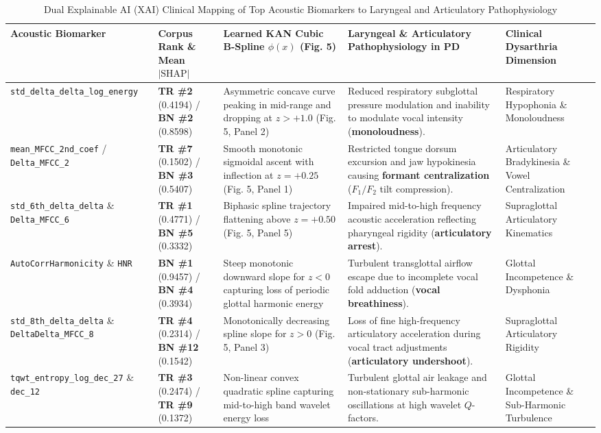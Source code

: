 \documentclass[journal,10pt,twoside]{IEEEtran}
\begin{document}
\begin{table}[t]
\caption{Dual Explainable AI (XAI) Clinical Mapping of Top Acoustic Biomarkers to Laryngeal and Articulatory Pathophysiology}
\label{tab:xai}
\centering
\scriptsize
\begin{tabular}{lp{3.2cm}p{4.2cm}p{4.5cm}l}
\toprule
\textbf{Acoustic Biomarker} & \textbf{Corpus Rank \& Mean $|\text{SHAP}|$} & \textbf{Learned KAN Cubic B-Spline $\phi(x)$ (Fig. 5)} & \textbf{Laryngeal \& Articulatory Pathophysiology in PD} & \textbf{Clinical Dysarthria Dimension} \\
\midrule
\texttt{std\_delta\_delta\_log\_energy} & \textbf{TR \#2} (0.4194) / \textbf{BN \#2} (0.8598) & Asymmetric concave curve peaking in mid-range and dropping at $z > +1.0$ (Fig. 5, Panel 2) & Reduced respiratory subglottal pressure modulation and inability to modulate vocal intensity (\textbf{monoloudness}). & Respiratory Hypophonia \& Monoloudness \\
\texttt{mean\_MFCC\_2nd\_coef} / \texttt{Delta\_MFCC\_2} & \textbf{TR \#7} (0.1502) / \textbf{BN \#3} (0.5407) & Smooth monotonic sigmoidal ascent with inflection at $z = +0.25$ (Fig. 5, Panel 1) & Restricted tongue dorsum excursion and jaw hypokinesia causing \textbf{formant centralization} ($F_1/F_2$ tilt compression). & Articulatory Bradykinesia \& Vowel Centralization \\
\texttt{std\_6th\_delta\_delta} \& \texttt{Delta\_MFCC\_6} & \textbf{TR \#1} (0.4771) / \textbf{BN \#5} (0.3332) & Biphasic spline trajectory flattening above $z = +0.50$ (Fig. 5, Panel 5) & Impaired mid-to-high frequency acoustic acceleration reflecting pharyngeal rigidity (\textbf{articulatory arrest}). & Supraglottal Articulatory Kinematics \\
\texttt{AutoCorrHarmonicity} \& \texttt{HNR} & \textbf{BN \#1} (0.9457) / \textbf{BN \#4} (0.3934) & Steep monotonic downward slope for $z < 0$ capturing loss of periodic glottal harmonic energy & Turbulent transglottal airflow escape due to incomplete vocal fold adduction (\textbf{vocal breathiness}). & Glottal Incompetence \& Dysphonia \\
\texttt{std\_8th\_delta\_delta} \& \texttt{DeltaDelta\_MFCC\_8} & \textbf{TR \#4} (0.2314) / \textbf{BN \#12} (0.1542) & Monotonically decreasing spline slope for $z > 0$ (Fig. 5, Panel 3) & Loss of fine high-frequency articulatory acceleration during vocal tract adjustments (\textbf{articulatory undershoot}). & Supraglottal Articulatory Rigidity \\
\texttt{tqwt\_entropy\_log\_dec\_27} \& \texttt{dec\_12} & \textbf{TR \#3} (0.2474) / \textbf{TR \#9} (0.1372) & Non-linear convex quadratic spline capturing mid-to-high band wavelet energy loss & Turbulent glottal air leakage and non-stationary sub-harmonic oscillations at high wavelet $Q$-factors. & Glottal Incompetence \& Sub-Harmonic Turbulence \\

\end{tabular}
\end{table}
\end{document}
